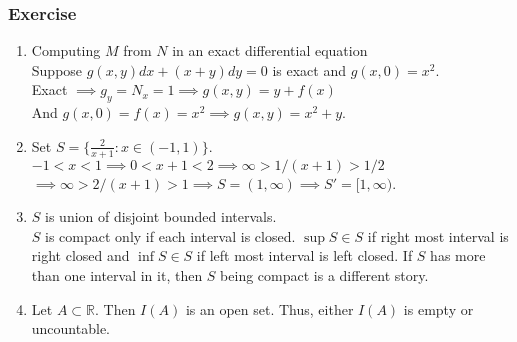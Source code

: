\subsubsection*{Exercise}
\begin{enumerate}
	\item Computing $M$ from $N$ in an exact differential equation\\
		Suppose $g(x,y)dx + (x+y)dy = 0$ is exact and $g(x,0) = x^2$.\\
		Exact $\implies g_y = N_x = 1 \implies g(x,y) = y+f(x)$\\ And $g(x,0) = f(x) = x^2 \implies g(x,y) = x^2+y$.
	\item Set $S = \{ \frac{2}{x+1} : x \in (-1,1) \}$.\\
		$-1 < x < 1 \implies 0 < x+1 < 2 \implies \infty > 1/(x+1) > 1/2$\\
		$\implies \infty > 2/(x+1) > 1 \implies S = (1,\infty) \implies S' = [1,\infty)$.
	\item $S$ is union of disjoint bounded intervals.\\
		$S$ is compact only if each interval is closed. $\sup S \in S$ if right most interval is right closed and $\inf S \in S$ if left most interval is left closed. If $S$ has more than one interval in it, then $S$ being compact is a different story.
	\item Let $A \subset \mathbb{R}$. Then $I(A)$ is an open set. Thus, either $I(A)$ is empty or uncountable.
\end{enumerate}

